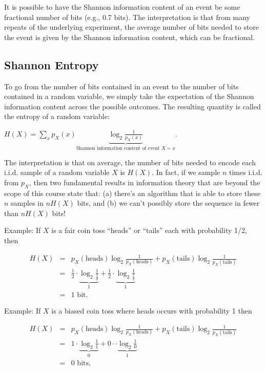 \documentclass[6008notes.tex]{subfiles}
\begin{document}
It is possible to have the Shannon information content of an event be some fractional number of bits (e.g., 0.7 bits). The interpretation is that from many repeats of the underlying experiment, the average number of bits needed to store the event is given by the Shannon information content, which can be fractional.

\subsection{Shannon Entropy}

To go from the number of bits contained in an event to the number of bits contained in a random variable, we simply take the expectation of the Shannon information content across the possible outcomes. The resulting quantity is called the entropy of a random variable:

{\centering$H(X)=\sum _{x}p_{X}(x)\underbrace{\log _{2}\frac{1}{p_{X}(x)}}_{\text {Shannon information content of event }X=x}.$ \par}
 
The interpretation is that on average, the number of bits needed to encode each i.i.d. sample of a random variable $X$ is $H(X)$. In fact, if we sample $n$ times i.i.d. from $p_X$, then two fundamental results in information theory that are beyond the scope of this course state that: (a) there's an algorithm that is able to store these $n$ samples in $nH(X)$ bits, and (b) we can't possibly store the sequence in fewer than $nH(X)$ bits!

Example: If $X$ is a fair coin toss ``heads'' or ``tails'' each with probability 1/2, then

\begin{eqnarray*}
H(X)
&=& p_X(\text{heads}) \log_2 \frac1{p_X(\text{heads})}
+ p_X(\text{tails}) \log_2 \frac1{p_X(\text{tails})} \\
&=& \frac12 \cdot \underbrace{\log_2 \frac1{\frac{1}{2}}}_1
+ \frac12 \cdot \underbrace{\log_2 \frac1{\frac{1}{2}}}_1 \\
&=& 1 \text{ bit}.
\end{eqnarray*}
 
Example: If $X$ is a biased coin toss where heads occurs with probability 1 then

\begin{eqnarray*}
H(X)
&=& p_X(\text{heads}) \log_2 \frac1{p_X(\text{heads})}
+ p_X(\text{tails}) \log_2 \frac1{p_X(\text{tails})} \\
&=& 1 \cdot \underbrace{\log_2 \frac11}_0
+ 0 \cdot \cdot \underbrace{\log_2 \frac10}_1 \\
&=& 0 \text{ bits},
\end{eqnarray*}
 
\end{document}
